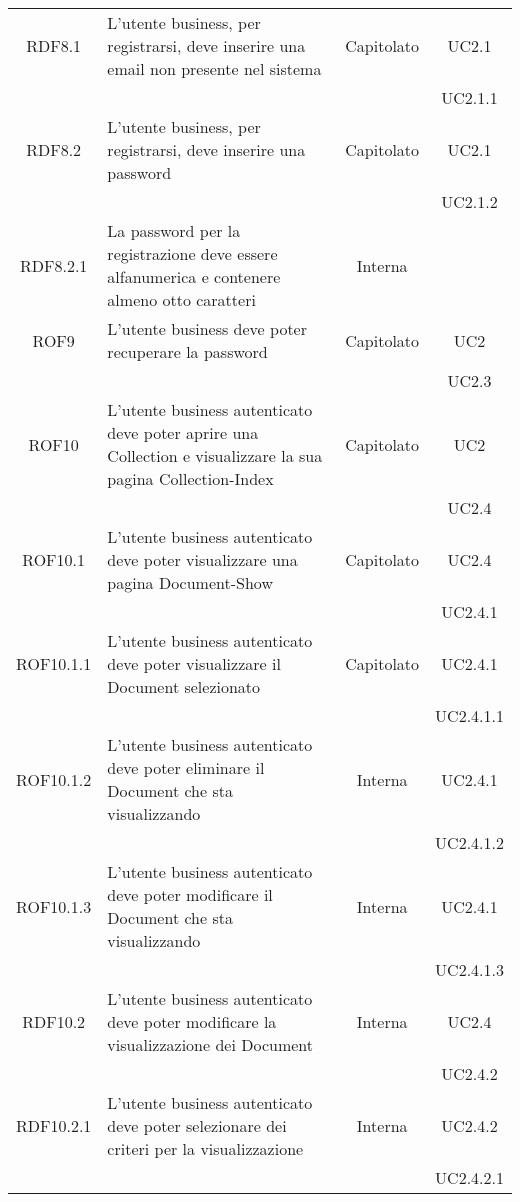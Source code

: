 \begin{longtable}{|c|p{6cm}|c|c|}
\midrule
RDF8.1
& L'utente business, per registrarsi, deve inserire una email non presente nel sistema
& Capitolato
& UC2.1\\
& & & UC2.1.1
\\

\midrule
RDF8.2
& L'utente business, per registrarsi, deve inserire una password
& Capitolato
& UC2.1\\
& & & UC2.1.2
\\

\midrule
RDF8.2.1
& La password per la registrazione deve essere alfanumerica e contenere almeno otto caratteri
& Interna
&
\\

\midrule
ROF9
& L'utente business deve poter recuperare la password
& Capitolato
& UC2\\
& & & UC2.3
\\

\midrule
ROF10
& L'utente business autenticato deve poter aprire una Collection e visualizzare la sua pagina Collection-Index
& Capitolato
& UC2\\
& & & UC2.4
\\

\midrule
ROF10.1
& L'utente business autenticato deve poter visualizzare una pagina Document-Show
& Capitolato
& UC2.4\\
& & & UC2.4.1
\\

\midrule
ROF10.1.1
& L'utente business autenticato deve poter visualizzare il Document selezionato
& Capitolato
& UC2.4.1\\
& & & UC2.4.1.1
\\

\midrule
ROF10.1.2
& L'utente business autenticato deve poter eliminare il Document che sta visualizzando
& Interna
& UC2.4.1\\
& & & UC2.4.1.2
\\

\midrule
ROF10.1.3
& L'utente business autenticato deve poter modificare il Document che sta visualizzando
& Interna
& UC2.4.1\\
& & & UC2.4.1.3
\\

\midrule
RDF10.2
& L'utente business autenticato deve poter modificare la visualizzazione dei Document
& Interna
& UC2.4\\
& & & UC2.4.2
\\

\midrule
RDF10.2.1
& L'utente business autenticato deve poter selezionare dei criteri per la visualizzazione
& Interna
& UC2.4.2\\
& & & UC2.4.2.1
\\


\end{longtable}
